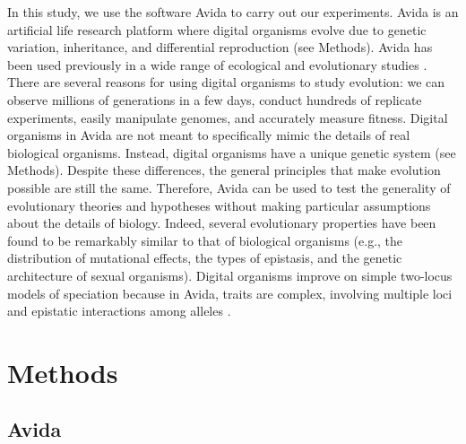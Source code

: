 \begin{doublespace}
In this study, we use the software Avida to carry out our experiments.
%
Avida \citep{ofr04} is an artificial life research platform
where digital organisms evolve due to genetic variation, inheritance,
and differential reproduction (see Methods).
%
Avida has been used previously
in a wide range of ecological and evolutionary studies
\citep[e.g.,][]{len03,cho04,ele07,ost07,mis10}.
%
There are several reasons for using digital organisms to study evolution:
we can observe millions of generations in a few days,
conduct hundreds of replicate experiments,
easily manipulate genomes,
and accurately measure fitness.
%
Digital organisms in Avida are not meant to specifically mimic
the details of real biological organisms.
%
Instead, digital organisms have a unique genetic system (see Methods).
%
Despite these differences, the general principles
that make evolution possible are still the same.
%
Therefore, Avida can be used to test the generality
of evolutionary theories and hypotheses without making particular assumptions
about the details of biology.
%
Indeed, several evolutionary properties
have been found to be remarkably similar to that of biological organisms
\citep{wil02,ada06}
(e.g., the distribution of mutational effects, the types of epistasis,
and the genetic architecture of sexual organisms).
%
Digital organisms improve on simple two-locus models of speciation
because in Avida, traits are complex,
involving multiple loci and epistatic interactions among alleles \citep{len99}.



\section{Methods}

\subsection{Avida}




\end{doublespace}
